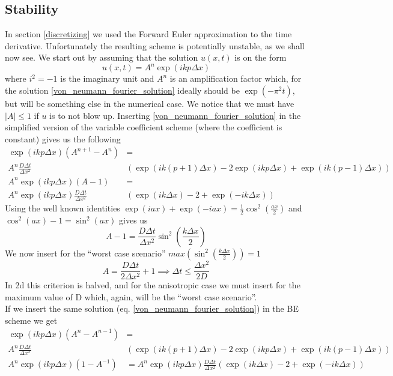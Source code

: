 \subsection{Stability}\label{stability}

In section \ref{discretizing} we used the Forward Euler approximation to the time derivative. 
Unfortunately the resulting scheme is potentially unstable, as we shall now see. 
We start out by assuming that the solution $u(x,t)$ is on the form 
\begin{equation}\label{von_neumann_fourier_solution}
 u(x,t) = A^n\exp(ikp\Delta x)
\end{equation}
where $i^2=-1$ is the imaginary unit and $A^n$ is an amplification factor which, for the solution \ref{von_neumann_fourier_solution} ideally should be $\exp(-\pi^2t)$, but will be something else in the numerical case. 
We notice that we must have $\left|A\right|\leq 1$ if $u$ is to not blow up. 
Inserting \ref{von_neumann_fourier_solution} in the simplified version of the variable coefficient scheme (where the coefficient is constant) gives us the following
\begin{align*}
 \exp(ikp\Delta x)\left(A^{n+1}-A^n\right) &= \\
 A^n\frac{D\Delta t}{\Delta x^2}&\left(\exp(ik(p+1)\Delta x)-2\exp(ikp\Delta x) +\exp(ik(p-1)\Delta x)\right)\\
  A^n\exp(ikp\Delta x)\left(A-1\right) &= \\
  A^n\exp(ikp\Delta x)\frac{D\Delta t}{\Delta x^2}&\left(\exp(ik\Delta x) -2  + \exp(-ik\Delta x)\right)
\end{align*}
Using the well known identities $\exp(iax)+\exp(-iax) = \frac{1}{2}\cos^2\left(\frac{ax}{2}\right)$  and $\cos^2(ax)-1 = \sin^2(ax)$ gives us
\begin{equation}
 A-1 = \frac{D\Delta t}{\Delta x^2}\sin^2\left(\frac{k\Delta x}{2}\right)
\end{equation}
We now insert for the ``worst case scenario'' $max(\sin^2\left(\frac{k\Delta x}{2}\right))= 1$
\begin{equation}
 A = \frac{D\Delta t}{2\Delta x^2}+1 \implies \Delta t\leq\frac{\Delta x^2}{2D}
\end{equation}
In 2d this criterion is halved, and for the anisotropic case we must insert for the maximum value of D which, again, will be the ``worst case scenario''.\\
If we insert the same solution (eq. \ref{von_neumann_fourier_solution}) in the BE scheme we get
\begin{align*}
 \exp(ikp\Delta x)\left(A^{n}-A^{n-1}\right) &= \\
 A^n\frac{D\Delta t}{\Delta x^2}&\left(\exp(ik(p+1)\Delta x)-2\exp(ikp\Delta x) +\exp(ik(p-1)\Delta x)\right)\\
  A^n\exp(ikp\Delta x)\left(1-A^{-1}\right) &=  A^n\exp(ikp\Delta x)\frac{D\Delta t}{\Delta x^2}\left(\exp(ik\Delta x) -2 + \exp(-ik\Delta x)\right)\\
\end{align*}
